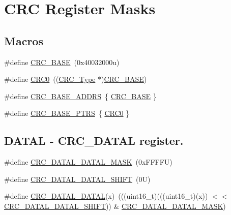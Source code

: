 \hypertarget{group___c_r_c___register___masks}{}\section{C\+RC Register Masks}
\label{group___c_r_c___register___masks}
\subsection*{Macros}
\begin{DoxyCompactItemize}
\item 
\#define \mbox{\hyperlink{group___c_r_c___register___masks_ga656a447589e785594cbf2f45c835ad7e}{C\+R\+C\+\_\+\+B\+A\+SE}}~(0x40032000u)
\item 
\#define \mbox{\hyperlink{group___c_r_c___register___masks_ga63a00bd3e91184e000bd4dcf87c539f9}{C\+R\+C0}}~((\mbox{\hyperlink{struct_c_r_c___type}{C\+R\+C\+\_\+\+Type}} $\ast$)\mbox{\hyperlink{group___c_r_c___register___masks_ga656a447589e785594cbf2f45c835ad7e}{C\+R\+C\+\_\+\+B\+A\+SE}})
\item 
\#define \mbox{\hyperlink{group___c_r_c___register___masks_ga588ae3592324fa73ed599a467515c05e}{C\+R\+C\+\_\+\+B\+A\+S\+E\+\_\+\+A\+D\+D\+RS}}~\{ \mbox{\hyperlink{group___c_r_c___register___masks_ga656a447589e785594cbf2f45c835ad7e}{C\+R\+C\+\_\+\+B\+A\+SE}} \}
\item 
\#define \mbox{\hyperlink{group___c_r_c___register___masks_ga0532d18a8549a09065845e5210ca6876}{C\+R\+C\+\_\+\+B\+A\+S\+E\+\_\+\+P\+T\+RS}}~\{ \mbox{\hyperlink{group___c_r_c___register___masks_ga63a00bd3e91184e000bd4dcf87c539f9}{C\+R\+C0}} \}
\end{DoxyCompactItemize}
\subsection*{D\+A\+T\+AL -\/ C\+R\+C\+\_\+\+D\+A\+T\+AL register.}
\begin{DoxyCompactItemize}
\item 
\#define \mbox{\hyperlink{group___c_r_c___register___masks_ga8bad59d8f638bc49c5c098b0be9beb23}{C\+R\+C\+\_\+\+D\+A\+T\+A\+L\+\_\+\+D\+A\+T\+A\+L\+\_\+\+M\+A\+SK}}~(0x\+F\+F\+F\+F\+U)
\item 
\#define \mbox{\hyperlink{group___c_r_c___register___masks_ga99d9068960a7ec56ab525b22628d74ee}{C\+R\+C\+\_\+\+D\+A\+T\+A\+L\+\_\+\+D\+A\+T\+A\+L\+\_\+\+S\+H\+I\+FT}}~(0\+U)
\item 
\#define \mbox{\hyperlink{group___c_r_c___register___masks_ga5aa800e3872374aae006a458ac46e48e}{C\+R\+C\+\_\+\+D\+A\+T\+A\+L\+\_\+\+D\+A\+T\+AL}}(x)~(((uint16\+\_\+t)(((uint16\+\_\+t)(x)) $<$$<$ \mbox{\hyperlink{group___c_r_c___register___masks_ga99d9068960a7ec56ab525b22628d74ee}{C\+R\+C\+\_\+\+D\+A\+T\+A\+L\+\_\+\+D\+A\+T\+A\+L\+\_\+\+S\+H\+I\+FT}})) \& \mbox{\hyperlink{group___c_r_c___register___masks_ga8bad59d8f638bc49c5c098b0be9beb23}{C\+R\+C\+\_\+\+D\+A\+T\+A\+L\+\_\+\+D\+A\+T\+A\+L\+\_\+\+M\+A\+SK}})
\end{DoxyCompactItemize}
